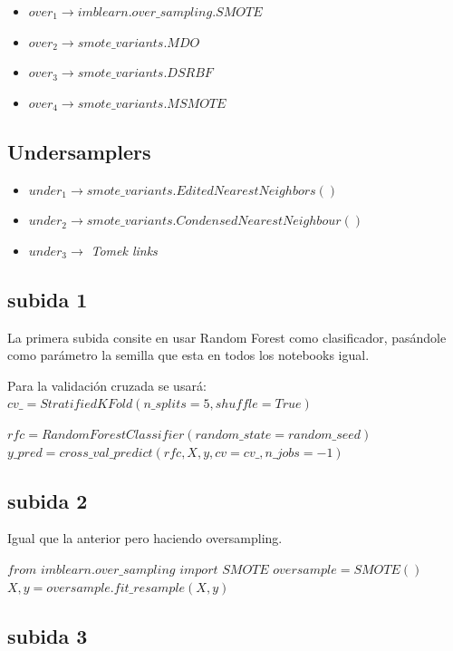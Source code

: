 \begin{itemize}
\item $over_{1} \rightarrow imblearn.over\_sampling.SMOTE$
\item $over_{2} \rightarrow smote\_variants.MDO$
\item $over_{3} \rightarrow smote\_variants.DSRBF$
\item $over_{4} \rightarrow smote\_variants.MSMOTE$
\end{itemize}

\subsection{Undersamplers}
\begin{itemize}
\item $under_{1} \rightarrow smote\_variants.EditedNearestNeighbors()$
\item $under_{2} \rightarrow smote\_variants.CondensedNearestNeighbour()$
\item $under_{3} \rightarrow $ \textit{Tomek links}
\end{itemize}

\subsection{subida 1}
La primera subida consite en usar Random Forest como clasificador, pasándole como parámetro la semilla que esta en todos los notebooks igual.

Para la validación cruzada se usará:
$cv\_ = StratifiedKFold(n\_splits=5, shuffle=True)$

$rfc = RandomForestClassifier(random\_state=random\_seed)$\newline
$y\_pred = cross\_val\_predict(rfc, X, y, cv=cv\_, n\_jobs=-1)$

\subsection{subida 2}

Igual que la anterior pero haciendo oversampling.

$from$ $imblearn.over\_sampling$ $import$ $SMOTE$\newline
$oversample = SMOTE()$\newline
$X, y = oversample.fit\_resample(X, y)$\newline

\subsection{subida 3}

